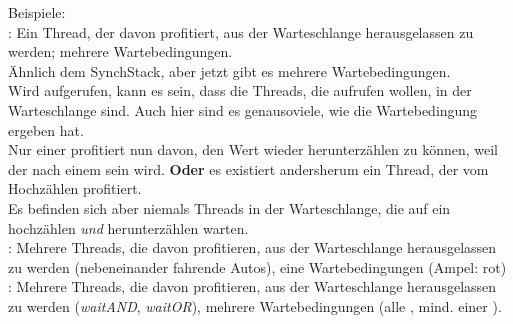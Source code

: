 \noindent
Beispiele:\\

\noindent
{}: Ein Thread, der davon profitiert, aus der Warteschlange herausgelassen zu werden; mehrere Wartebedingungen.\\
Ähnlich dem SynchStack, aber jetzt gibt es mehrere Wartebedingungen.\\
Wird  aufgerufen, kann es sein, dass die Threads, die  aufrufen wollen, in der Warteschlange sind.
Auch hier sind es genausoviele, wie die Wartebedingung  ergeben hat.\\
Nur einer profitiert nun davon, den Wert wieder herunterzählen zu können, weil der  nach einem   sein wird.
\textbf{Oder} es existiert andersherum ein Thread, der vom Hochzählen profitiert.\\
Es befinden sich aber niemals Threads in der Warteschlange, die auf ein hochzählen \textit{und} herunterzählen warten.\\

\noindent
{}: Mehrere Threads, die davon profitieren, aus der Warteschlange herausgelassen zu werden (nebeneinander fahrende Autos), eine Wartebedingungen (Ampel: rot)\\

\noindent
{}: Mehrere Threads, die davon profitieren, aus der Warteschlange herausgelassen zu werden (\textit{waitAND}, \textit{waitOR}), mehrere Wartebedingungen (alle , mind. einer ).







